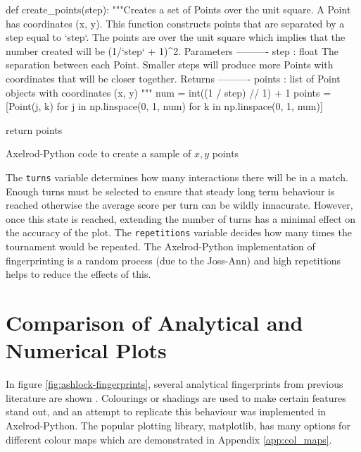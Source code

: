 \begin{listing}[hbtp!]
\begin{SourceCode}
def create_points(step):
    """Creates a set of Points over the unit square.
    A Point has coordinates (x, y). This function constructs points that are
    separated by a step equal to `step`. The points are over the unit
    square which implies that the number created will be (1/`step` + 1)^2.
    Parameters
    ----------
    step : float
        The separation between each Point. Smaller steps will produce more
        Points with coordinates that will be closer together.
    Returns
    ----------
    points : list
        of Point objects with coordinates (x, y)
    """
    num = int((1 / step) // 1) + 1
    points = [Point(j, k) for j in np.linspace(0, 1, num)
              for k in np.linspace(0, 1, num)]

    return points
\end{SourceCode}
\caption{Axelrod-Python code to create a sample of $x,y$ points}
\label{lst:create-points}
\end{listing}

The \texttt{turns} variable determines how many interactions there will be in a match.
Enough turns must be selected to ensure that steady long term behaviour is reached otherwise the average score per turn can be wildly innacurate.
However, once this state is reached, extending the number of turns has a minimal effect on the accuracy of the plot.
The \texttt{repetitions} variable decides how many times the tournament would be repeated.
The Axelrod-Python implementation of fingerprinting is a random process (due to the Joss-Ann) and high repetitions helps to reduce the effects of this.


\section{Comparison of Analytical and Numerical Plots}

In figure \ref{fig:ashlock-fingerprints}, several analytical fingerprints from previous literature are shown \cite{Ashlock2004, Ashlock2008}.
Colourings or shadings are used to make certain features stand out, and an attempt to replicate this behaviour was implemented in Axelrod-Python.
The popular plotting library, matplotlib, has many options for different colour maps which are demonstrated in Appendix \ref{app:col_maps}.

